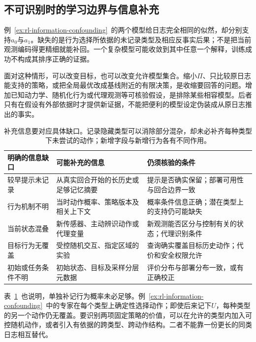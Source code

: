 \subsection{不可识别时的学习边界与信息补充}
\label{sec:rl-information-unidentifiable}

例~\ref{ex:rl-information-confounding}~的两个模型给日志完全相同的似然，却分别支持$a_0$与$a_1$。缺失的是行为选择所依据的未记录类型及相应反事实后果；不是把当前观测编码得更精细就能补回。一个复杂模型可能收敛到其中任意一个解释，训练成功不构成其排序正确的证据。

面对这种情形，可以改变目标，也可以改变允许模型集合。缩小$\Pi$、只比较原日志能支持的策略，或把全局最优改成基线附近的有限决策，是收缩要回答的问题。增加已知动力学、随机化行为或代理观测等可核验假设，是排除某些相容模型。后者只有在假设有外部依据时才提供新证据，不能把便利的模型设定伪装成从原日志推出的事实。

\begin{table}[htbp]
  \centering
  \small
  \begin{tabularx}{\linewidth}{p{26mm}XX}
    \toprule
    明确的信息缺口 & 可能补充的信息 & 仍须核验的条件 \\
    \midrule
    较早提示未记录 & 从真实回合开始的长历史或足够记忆摘要 & 提示是否确实保留；部署可用性与回合边界一致 \\
    行为机制不明 & 当时动作概率、策略版本及相关上下文 & 概率条件信息正确；潜在类型上的支持仍可能缺失 \\
    当前状态混叠 & 新传感器、主动辨识动作或代理变量 & 新观测能否区分与控制有关的状态；代理识别条件 \\
    目标行为无覆盖 & 受控随机交互、指定区域的实验 & 查询确实覆盖目标历史动作；代价和安全权限允许 \\
    初始或任务条件不明 & 初始状态、目标及采样分层元数据 & 评价分布与部署分布一致，或有正确校正 \\
    \bottomrule
  \end{tabularx}
  \caption{补充信息要对应具体缺口。记录隐藏类型可以消除部分混杂，却未必补齐每种类型下未尝试的动作；新增字段与新增行为各有不同作用。}
  \label{tab:rl-information-information-repair}
\end{table}

表~\ref{tab:rl-information-information-repair}~也说明，单独补记行为概率未必足够。例~\ref{ex:rl-information-confounding}~中的专家在每个类型上确定性选择动作；即使后来记下$U$，每种类型的另一个动作仍无覆盖。要识别两项固定策略的价值，可以在允许的类型内加入可控随机动作，或者引入有依据的跨类型、跨动作结构。二者不能靠一份更长的同类日志相互替代。

